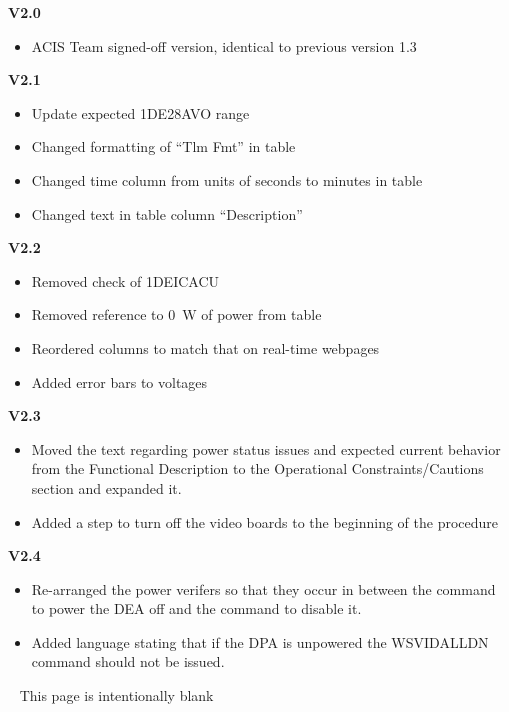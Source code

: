 \documentclass[11pt]{article}
\begin{document}
{\bf V2.0}
\begin{itemize}
\item ACIS Team signed-off version, identical to previous version 1.3
\end{itemize}

{\bf V2.1}
\begin{itemize}
\item Update expected 1DE28AVO range
\item Changed formatting of ``Tlm Fmt'' in table
\item Changed time column from units of seconds to minutes in table
\item Changed text in table column ``Description''
\end{itemize}

{\bf V2.2}
\begin{itemize}
\item Removed check of 1DEICACU
\item Removed reference to 0~W of power from table
\item Reordered columns to match that on real-time webpages
\item Added error bars to voltages
\end{itemize}

{\bf V2.3}
\begin{itemize}
\item Moved the text regarding power status issues and expected current behavior 
from the Functional Description to the Operational Constraints/Cautions section 
and expanded it.
\item Added a step to turn off the video boards to the beginning of the procedure
\end{itemize}

{\bf V2.4}
\begin{itemize}
\item Re-arranged the power verifers so that they occur in between the command
to power the DEA off and the command to disable it. 
\item Added language stating that if the DPA is unpowered the WSVIDALLDN command
should not be issued.
\end{itemize}

\newpage\
\vspace{0.4\textheight}
\bc This page is intentionally blank \ec

\newcommand{\tablecaptiontext}{TURN OFF DEA A}

\end{document}
